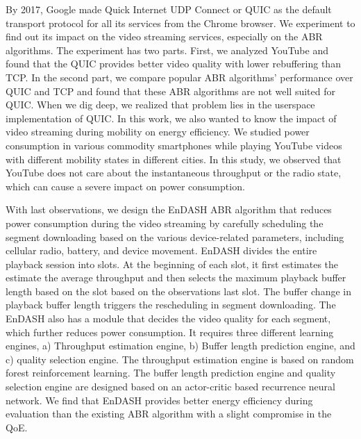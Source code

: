 {By 2017, Google made Quick Internet UDP Connect or QUIC as the default transport protocol for all its services from the Chrome browser. We experiment to find out its impact on the video streaming services, especially on the ABR algorithms. The experiment has two parts. First, we analyzed YouTube and found that the QUIC provides better video quality with lower rebuffering than TCP. In the second part, we compare popular ABR algorithms' performance over QUIC and TCP and found that these ABR algorithms are not well suited for QUIC. When we dig deep, we realized that problem lies in the userspace implementation of QUIC. In this work, we also wanted to know the impact of video streaming during mobility on energy efficiency. We studied power consumption in various commodity smartphones while playing YouTube videos with different mobility states in different cities. In this study, we observed that YouTube does not care about the instantaneous throughput or the radio state, which can cause a severe impact on power consumption.

With last observations, we design the EnDASH ABR algorithm that reduces power consumption during the video streaming by carefully scheduling the segment downloading based on the various device-related parameters, including cellular radio, battery, and device movement. EnDASH divides the entire playback session into slots. At the beginning of each slot, it first estimates the estimate the average throughput and then selects the maximum playback buffer length based on the slot based on the observations last slot. The buffer change in playback buffer length triggers the rescheduling in segment downloading. The EnDASH also has a module that decides the video quality for each segment, which further reduces power consumption. It requires three different learning engines, a) Throughput estimation engine, b) Buffer length prediction engine, and c) quality selection engine. The throughput estimation engine is based on random forest reinforcement learning. The buffer length prediction engine and quality selection engine are designed based on an actor-critic based recurrence neural network. We find that EnDASH provides better energy efficiency during evaluation than the existing ABR algorithm with a slight compromise in the QoE.

}
